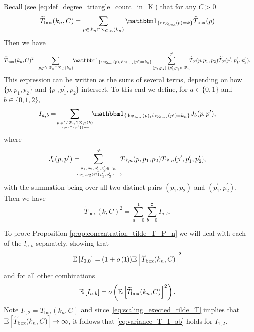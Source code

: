 Recall (see \eqref{eq:def_degree_triangle_count_in_K}) that for any $C > 0$
\[
	\widetilde{T}_{\text{box}}(k_n,C) = \sum_{p \in \Pcal_n \cap \Kcal_{C,n}(k_n)} \ind{\text{deg}_{\text{box}}(p) = k} \widetilde{T}_{\text{box}}(p)
\]
Then we have
\[
	\widetilde{T}_{\text{box}}(k_n,C)^2 = \hspace{-5pt} \sum_{p, p^\prime \in \Pcal_n \cap \Kcal_C(k_n)}
		\hspace{-3pt} \ind{\Dbox(p), \, \Dbox(p^\prime) = k_n} 
		\sum_{(p_1, p_2), (p_1^\prime, p_2^\prime) \in \Pcal_n}^{\ne} \hspace{-3pt}
		\widetilde{T}_{\Pcal}(p,p_1,p_2) \widetilde{T}_{\Pcal}(p^\prime, p_1^\prime, p_2^\prime),
\]
This expression can be written as the sums of several terms, depending on how $\{p, p_1, p_2\}$ and $\{p^\prime, p_1^\prime, p_2^\prime\}$ intersect. To this end we define, for $a \in \{0,1\}$ and $b \in \{0,1,2\}$,
\[
	I_{a,b} = \hspace{-3pt} \sum_{p, p^\prime \in \Pcal_n \cap \Kcal_C(k) \atop |\{p\} \cap \{p^\prime\}| = a}
	\hspace{-5pt} \ind{\Dbox(p), \, \Dbox(p^\prime) = k_n} J_b(p,p^\prime),
\]
where
\[
	J_b(p,p^\prime) = \hspace{-10pt} \sum_{p_1, p_2, p_1^\prime, p_2^\prime \in \Pcal_n 
		\atop |\{p_1, p_2\} \cap \{p_1^\prime, p_2^\prime\}| = b}^{\ne}
		\hspace{-5pt} T_{\Pcal,n}(p,p_1,p_2) T_{\Pcal,n}(p^\prime, p_1^\prime, p_2^\prime),
\]
with the summation being over all two distinct pairs $(p_1, p_2)$ and $(p_1^\prime, p_2^\prime)$. Then we have
\[
	\widetilde{T}_{\text{box}}(k, C)^2 = \sum_{a = 0}^1 \sum_{b = 0}^2 I_{a,b}.
\]

To prove Proposition \ref{prop:concentration_tilde_T_P_n} we will deal with each of the $I_{a,b}$ separately, showing that 
\begin{equation}\label{eq:variance_T_I_00}
	\mathbb{E}\left[I_{0,0}\right] = (1+o\left(1\right))\mathbb{E}\left[\widetilde{T}_{\text{box}}(k_n,C)\right]^2
\end{equation}
and for all other combinations
\begin{equation}\label{eq:variance_T_I_ab}
	\mathbb{E}\left[I_{a,b}\right] = o\left(\mathbb{E}\left[\widetilde{T}_{\text{box}}(k_n,C)\right]^2\right).
\end{equation}
Note $I_{1,2} = \widetilde{T}_{\text{box}}(k_n,C)$ and since~\eqref{eq:scaling_exected_tilde_T} implies that $\mathbb{E}\left[\widetilde{T}_{\text{box}}(k_n,C)\right] \to \infty$, it follows that \eqref{eq:variance_T_I_ab} holds for $I_{1,2}$. 

